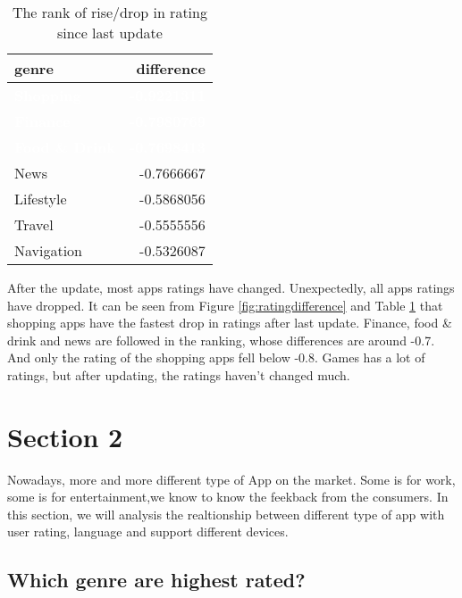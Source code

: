 \documentclass[
]{article}
\begin{document}
\begin{table}[!h]

\caption{\label{tab:rankratingdifference}The rank of rise/drop in rating since last update}
\centering
\begin{tabular}[t]{l|r}
\hline
genre & difference\\
\hline
\rowcolor{gray!6}  \rowcolor{steelblue}  \textcolor{white}{\textbf{Shopping}} & \textcolor{white}{\textbf{-0.9221311}}\\
\hline
\rowcolor{steelblue}  \textcolor{white}{\textbf{Finance}} & \textcolor{white}{\textbf{-0.7980769}}\\
\hline
\rowcolor{gray!6}  \rowcolor{steelblue}  \textcolor{white}{\textbf{Food \& Drink}} & \textcolor{white}{\textbf{-0.7698413}}\\
\hline
News & -0.7666667\\
\hline
\rowcolor{gray!6}  Lifestyle & -0.5868056\\
\hline
Travel & -0.5555556\\
\hline
\rowcolor{gray!6}  Navigation & -0.5326087\\
\hline
\end{tabular}
\end{table}

After the update, most apps ratings have changed. Unexpectedly, all apps ratings have dropped. It can be seen from Figure \ref{fig:ratingdifference} and Table \ref{tab:rankratingdifference} that shopping apps have the fastest drop in ratings after last update. Finance, food \& drink and news are followed in the ranking, whose differences are around -0.7. And only the rating of the shopping apps fell below -0.8. Games has a lot of ratings, but after updating, the ratings haven't changed much.

\hypertarget{section-2}{%
\section{Section 2}\label{section-2}}

Nowadays, more and more different type of App on the market. Some is for work, some is for entertainment,we know to know the feekback from the consumers.
In this section, we will analysis the realtionship between different type of app with user rating, language and support different devices.

\hypertarget{which-genre-are-highest-rated}{%
\subsection{Which genre are highest rated?}\label{which-genre-are-highest-rated}}
\end{document}
